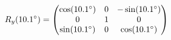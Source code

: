 \documentclass[preview]{standalone}
\begin{document}
\begin{align*}
\special{dvisvgm:raw <g id='unique000'>}R_y(10.1^\circ) = \begin{pmatrix} \cos(10.1^\circ) & 0 & -\sin(10.1^\circ) \\ 0 & 1 & 0 \\ \sin(10.1^\circ) & 0 & \cos(10.1^\circ) \end{pmatrix}\special{dvisvgm:raw </g>}
\end{align*}
\end{document}
